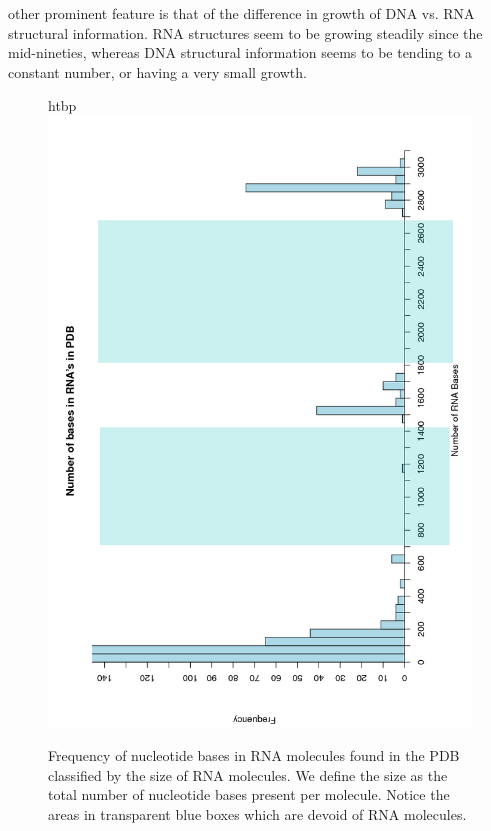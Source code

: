 other prominent feature is that of the difference in growth of DNA vs.
RNA structural information. RNA structures seem to be growing steadily
since the mid-nineties, whereas DNA structural information seems to be
tending to a constant number, or having a very small growth.
\begin{figure}{htbp}
\centering
\includegraphics[scale=0.50, angle=-90]{Chapter2/histogram.png}
\caption{Frequency of  nucleotide bases in RNA molecules  found in the
  PDB classified by  the size of RNA molecules. We  define the size as
  the total  number of nucleotide  bases present per  molecule. Notice
  the  areas  in  transparent  blue  boxes  which  are  devoid of  RNA
  molecules.}
  \label{fig:rnaranges}
\end{figure}

